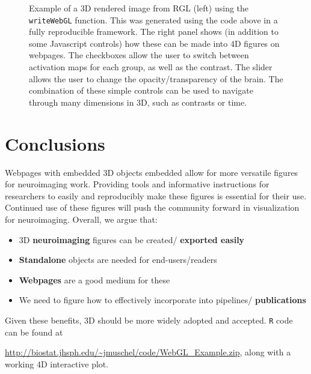 \documentclass[final]{beamer}\usepackage[]{graphicx}\usepackage[]{color}
\begin{document}
\begin{frame}[fragile]
\begin{multicols}{2}
\begin{figure}
\begin{minipage}[t]{3.5in}
  \end{minipage} \hfill
  \begin{minipage}[b]{7in}
    \caption{
		Example of a 3D rendered image from RGL (left) using the \texttt{writeWebGL} function.  This was generated using the code above in a fully reproducible framework.  The right panel shows (in addition to some Javascript controls) how these can be made into 4D figures on webpages.  The checkboxes allow the user to switch between activation maps for each group, as well as the contrast.  The slider allows the user to change the opacity/transparency of the brain.  The combination of these simple controls can be used to navigate through many dimensions in 3D, such as contrasts or time.   }   \label{fig:fig2}	
 \end{minipage}
\end{figure}
 



\section{Conclusions}

Webpages with embedded 3D objects embedded allow for more versatile figures for neuroimaging work. Providing tools and informative instructions for researchers to easily and reproducibly make these figures is essential for their use.  Continued use of these figures will push the community forward in visualization for neuroimaging.  Overall, we argue that:

\begin{itemize}

\item 3D  {\color{red} \bf neuroimaging} figures can be created/{\color{red} \bf exported easily} 
 
\item {\color{red} \bf Standalone}  objects are needed for end-users/readers
 
\item {\color{red} \bf Webpages}  are a good medium for these
 
\item We need to figure how to effectively incorporate into pipelines/{\color{red} \bf publications} 

\end{itemize}
Given these benefits, 3D should be more widely adopted and accepted. \texttt{R} code can be found at 

{\large \color{red} \url{http://biostat.jhsph.edu/~jmuschel/code/WebGL_Example.zip}}, along with a working 4D interactive plot.


\end{multicols}
\end{frame}
\end{document}
